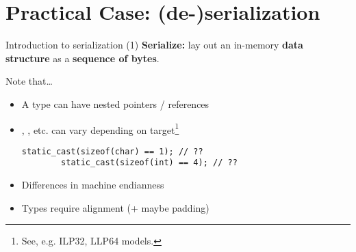 \section{Practical Case: (de-)serialization}

\begin{frame}[fragile]{Introduction to serialization (1)}
  \textbf{Serialize:} lay out an in-memory \textbf{data structure} as a \textbf{sequence of bytes}.
  \vfill

  \begin{block}{Note that\ldots}
    \begin{itemize}
    \item A type can have nested pointers / references

    \item {}, , etc. can vary depending on target\footnote{See, e.g. ILP32, LLP64 models.}
      \begin{lstlisting}[style=c++]
        static_cast(sizeof(char) == 1); // ??
        static_cast(sizeof(int) == 4); // ??
      \end{lstlisting}

    \item Differences in machine endianness

    \item Types require alignment (+ maybe padding)
    \end{itemize}
  \end{block}
\end{frame}

